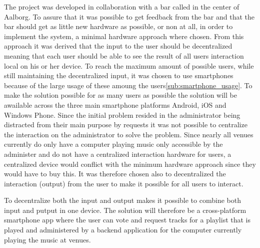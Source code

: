 The project was developed in collaboration with a bar called  in the center of Aalborg. To assure that it was possible to get feedback from the bar and that the bar should get as little new hardware as possible, or non at all, in order to implement the system, a minimal hardware approach where chosen.
From this approach it was derived that the input to the user should be decentralized meaning that each user should be able to see the result of all users interaction local on his or her device. To reach the maximum amount of possible users, while still maintaining the decentralized input, it was chosen to use smartphones because of the large usage of these amoung the users\cref{sub:smartphone_usage}. To make the solution possible for as many users as possible the solution will be awailable across the three main smartphone platforms Android, iOS and Windows Phone.
Since the initial problem resided in the administrator being distracted from their main purpose by requests it was not possible to centralize the interaction on the administrator to solve the problem. Since nearly all venues currently do only have a computer playing music only accessible by the administer and do not have a centralized interaction hardware for users, a centralized device would conflict with the minimum hardware approach since they would have to buy this. It was therefore chosen also to decentralized the interaction (output) from the user to make it possible for all users to interact.

To decentralize both the input and output makes it possible to combine both input and putput in one device. The solution will therefore be a cross-platform smartphone app where the user can vote and request tracks for a playlist that is played and administered by a backend application for the computer currently playing the music at venues.